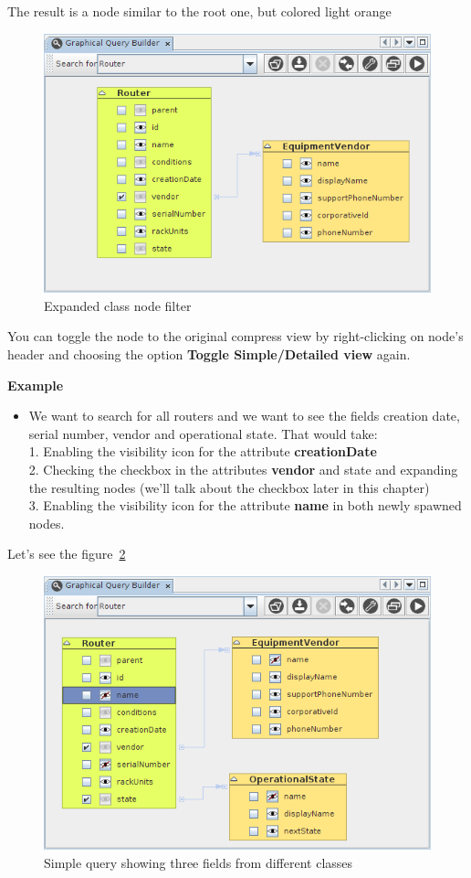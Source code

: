 \documentclass[a4paper]{article}
\begin{document}
	The result is a node similar to the root one, but colored light orange
	\begin{figure}[h!]
		\centering
		\includegraphics[width=0.8\linewidth]{img/query_detail_view.png}
		\caption{Expanded class node filter}
		\label{fig:query_detail_view}
	\end{figure}
	
	You can toggle the node to the original compress view by right-clicking on node's header and choosing the option \textbf{Toggle Simple/Detailed view} again.
	
	\begin{framed} {\large \textbf{Example}}
		\begin{itemize}
			\item We want to search for all routers and we want to see the fields creation date, serial number, vendor and operational state. That would take:
			\\1. Enabling the visibility icon for the attribute \textbf{creationDate}
			\\2. Checking the checkbox in the attributes  \textbf{vendor} and state and expanding the resulting nodes (we'll talk about the checkbox later in this chapter)
			\\3. Enabling the visibility icon for the attribute  \textbf{name} in both newly spawned nodes.
		\end{itemize}
	\end{framed}
	
	\newpage
	Let's see the figure~\ref{fig:query_multiple_nodes}
	\begin{figure}[h!]
		\centering
		\includegraphics[width=0.8\linewidth]{img/query_multiple_nodes.png}
		\caption{Simple query showing three fields from different classes}
		\label{fig:query_multiple_nodes}
	\end{figure}
	
\end{document}
